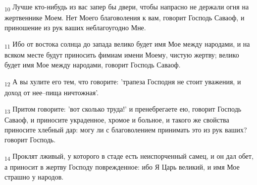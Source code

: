 \begin{tcolorbox}
\textsubscript{10} Лучше кто-нибудь из вас запер бы двери, чтобы напрасно не держали огня на жертвеннике Моем. Нет Моего благоволения к вам, говорит Господь Саваоф, и приношение из рук ваших неблагоугодно Мне.
\end{tcolorbox}
\begin{tcolorbox}
\textsubscript{11} Ибо от востока солнца до запада велико будет имя Мое между народами, и на всяком месте будут приносить фимиам имени Моему, чистую жертву; велико будет имя Мое между народами, говорит Господь Саваоф.
\end{tcolorbox}
\begin{tcolorbox}
\textsubscript{12} А вы хулите его тем, что говорите: 'трапеза Господня не стоит уважения, и доход от нее--пища ничтожная'.
\end{tcolorbox}
\begin{tcolorbox}
\textsubscript{13} Притом говорите: 'вот сколько труда!' и пренебрегаете ею, говорит Господь Саваоф, и приносите украденное, хромое и больное, и такого же свойства приносите хлебный дар: могу ли с благоволением принимать это из рук ваших? говорит Господь.
\end{tcolorbox}
\begin{tcolorbox}
\textsubscript{14} Проклят лживый, у которого в стаде есть неиспорченный самец, и он дал обет, а приносит в жертву Господу поврежденное: ибо Я Царь великий, и имя Мое страшно у народов.
\end{tcolorbox}
